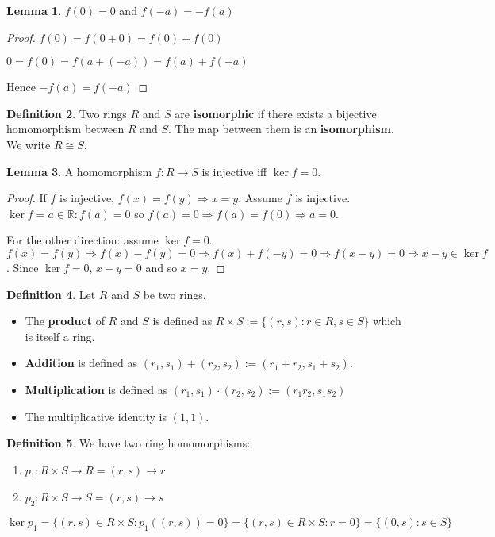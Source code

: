 \documentclass[12pt,a4paper]{article}
\theoremstyle{definition}
\newtheorem{definition}{Definition}[subsection]
\newtheorem{lemma}[definition]{Lemma}
\begin{document}
\begin{lemma}
	$f(0) = 0$ and $f(-a) = -f(a)$
\end{lemma}

\begin{proof}
	$f(0) = f(0 + 0) = f(0) + f(0)$

	$0 = f(0) = f(a + (-a)) = f(a) + f(-a)$

	Hence $-f(a) = f(-a)$
\end{proof}

\begin{definition}
	Two rings $R$ and $S$ are \textbf{isomorphic} if there exists a bijective homomorphism between $R$ and $S$. The map between them is an \textbf{isomorphism}. We write $R \cong S$.
\end{definition}

\begin{lemma}
	A homomorphism $f: R \rightarrow S$ is injective iff $\ker f = {0}$.
\end{lemma}

\begin{proof}
	If $f$ is injective, $f(x) = f(y) \Rightarrow x = y$. Assume $f$ is injective. $\ker f = {a \in \mathbb{R}: f(a) = 0}$ so $f(a) = 0 \Rightarrow f(a) = f(0) \Rightarrow a = 0$.

	For the other direction: assume $\ker f = {0}$. $f(x) = f(y) \Rightarrow f(x) - f(y) = 0 \Rightarrow f(x) + f(-y) = 0 \Rightarrow f(x - y) = 0 \Rightarrow x - y \in \ker f$. Since $\ker f = {0}$, $x - y = 0$ and so $x = y$.
\end{proof}

\begin{definition}
	Let $R$ and $S$ be two rings.
	\begin{itemize}
		\item The \textbf{product} of $R$ and $S$ is defined as $R \times S := \{(r, s): r \in R, s \in S\}$ which is itself a ring.
		\item \textbf{Addition} is defined as $(r_1, s_1) + (r_2, s_2) := (r_1 + r_2, s_1 + s_2)$.
		\item \textbf{Multiplication} is defined as $(r_1, s_1) \cdot (r_2, s_2) := (r_1 r_2, s_1 s_2)$
		\item The multiplicative identity is $(1, 1)$.
	\end{itemize}
\end{definition}

\begin{definition}
	We have two ring homomorphisms:
	\begin{enumerate}
		\item $p_1: R \times S \rightarrow R = (r, s) \rightarrow r$
		\item $p_2: R \times S \rightarrow S = (r, s) \rightarrow s$
	\end{enumerate}

	$\ker p_1 = \{(r, s) \in R \times S: p_1((r, s)) = 0\} = \{(r, s) \in R \times S: r = 0\} = \{(0, s): s \in S\}$
\end{definition}
\end{document}
